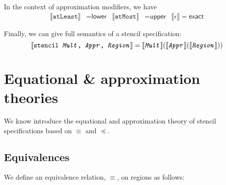 \documentclass{article}
\theoremstyle{definition}
\theoremstyle{plain}
\theoremstyle{remark}
\newcommand{\interp}[1]{\llbracket {#1} \rrbracket}
\newcommand{\textcap}[1]{\texttt{\textit{#1}}}
\begin{document}
In the context of approximation modifiers, we have
%
\begin{align*}
  \interp{\texttt{atLeast}} & = \textsf{lower} &
  \interp{\texttt{atMost}} & = \textsf{upper} &
  \llbracket \epsilon \rrbracket = \textsf{exact}
\end{align*}

Finally, we can give full semantics of a stencil specification:
%
\begin{equation*}
  \interp{\texttt{stencil \textcap{Mult}, \textcap{Appr}, \textcap{Region}}} =
    \interp{\textcap{Mult}}
           {(\interp{\textcap{Appr}}
                    {(\interp{\textcap{Region}})})}
\end{equation*}

\section{Equational \& approximation theories}

We know introduce the equational and approximation theory of stencil
specifications based on $\equiv$ and $\preceq$.

\subsection{Equivalences}

We define an equivalence relation, $\equiv$, on regions as follows:
\end{document}

